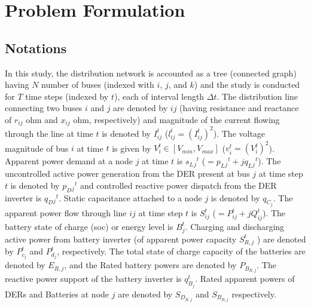 \documentclass[../../outputs/main.tex]{subfiles}
\begin{document}
\section{Problem Formulation}

\subsection{Notations}
In this study, the distribution network is accounted as a tree (connected graph) having \(N\) number of buses (indexed with \(i\), \(j\), and \(k\)) and the study is conducted for \(T\) time steps (indexed by \(t\)), each of interval length $\Delta t$. The distribution line connecting two buses \(i\) and \(j\) are denoted by {\(ij\)} (having resistance and reactance of \(r_{ij}\) ohm and \(x_{ij}\) ohm, respectively) and magnitude of the current flowing through the line at time \(t\) is denoted by \(I_{ij}^t\) (\(l_{ij}^t=\left(I_{ij}^t\right)^2\)). The voltage magnitude of bus \(i\) at time \(t\) is given by \(V_i^t \in [V_{min},V_{max}]\) (\(v_i^t=\left(V_i^t\right)^2\)). Apparent power demand at a node \(j\) at time \(t\) is \(s_L{_j}^t\) (\(=p_L{_j}^t+\textit{j}q_L{_j}^t\)). The uncontrolled active power generation from the DER present at bus \(j\) at time step \(t\) is denoted by \(p_D{_j}^t\) and controlled reactive power dispatch from the DER inverter is \(q_D{_j}^t\). Static capacitance attached to a node $j$ is denoted by $q_{C_{j}}$. The apparent power flow through line {\(ij\)} at time step \(t\) is \(S_{ij}^t\) (\(=P_{ij}^t+\textit{j}Q_{ij}^t\)). The battery state of charge (soc) or energy level is \(B_j^t\). Charging and discharging active power from battery inverter (of apparent power capacity \(S^{t}_{R, j}\) ) are denoted by \(P_{c_j}^t\) and \(P_{d_j}^t\), respectively. The total state of charge capacity of the batteries are denoted by $E_{R, j}$, and the Rated battery powers are denoted by $P_{B_{R, j}}$. The reactive power support of the battery inverter is \(q_{B_j}^t\). Rated apparent powers of DERs and Batteries at node $j$ are denoted by $S_{D_{R, j}}$ and $S_{B_{R, j}}$ respectively.
\end{document}
